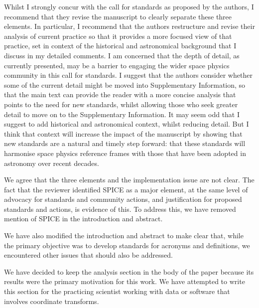 \documentclass[11pt]{article}
\begin{document}
Whilst I strongly concur with the call for standards as proposed by the authors, I recommend that they revise
the manuscript to clearly separate these three elements. In particular, I recommend that the authors
restructure and revise their analysis of current practice so that it provides a more focused view of that
practice, set in context of the historical and astronomical background that I discuss in my detailed
comments. I am concerned that the depth of detail, as currently presented, may be a barrier to engaging the
wider space physics community in this call for standards. I suggest that the authors consider whether some
of the current detail might be moved into Supplementary Information, so that the main text can provide the
reader with a more concise analysis that points to the need for new standards, whilst allowing those who
seek greater detail to move on to the Supplementary Information. It may seem odd that I suggest to add
historical and astronomical context, whilst reducing detail. But I think that context will increase the impact of
the manuscript by showing that new standards are a natural and timely step forward: that these standards
will harmonise space physics reference frames with those that have been adopted in astronomy over recent decades.
\\
{\color{violet}
\begin{leftbar}
We agree that the three elements and the implementation issue are not clear. The fact that the reviewer identified SPICE as a major element, at the same level of advocacy for standards and community actions, and justification for proposed standards and actions, is evidence of this. To address this, we have removed mention of SPICE in the introduction and abstract.

We have also modified the introduction and abstract to make clear that, while the primary objective was to develop standards for acronyms and definitions, we encountered other issues that should also be addressed.

We have decided to keep the analysis section in the body of the paper because its results were the primary motivation for this work. We have attempted to write this section for the practicing scientist working with data or software that involves coordinate transforms.

\end{leftbar}
}
\end{document}
